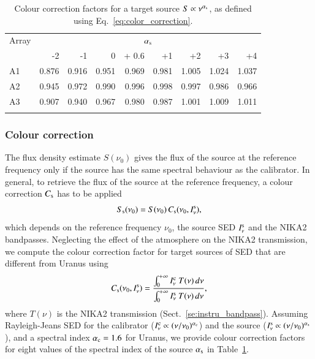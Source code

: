 \documentclass[traditionalabstract]{aa}
\begin{document}
\begin{table}[!thbp]
\caption{Colour correction factors for a target source  $S \propto \nu^{\alpha_{\rm{s}}}$, as defined using Eq.~\ref{eq:color_correction}.}
\label{tab:mod}
\centering 
\begin{tabular}{lrrrrrrrr}
\hline\hline
\noalign{\smallskip}
Array     & \multicolumn{8}{c}{$\alpha_{\rm{s}}$} \\
\noalign{\smallskip}
\hline
\noalign{\smallskip}
         &  -2 &  -1    &    0  & + 0.6 & +1  &  +2  & +3 & +4  \\       
\noalign{\smallskip}
\hline
\noalign{\smallskip}
          A1   & 0.876  &  0.916   &   0.951  & 0.969 &  0.981   &  1.005  &    1.024  &  1.037   \\
          A2   & 0.945  &  0.972   &   0.990  & 0.996 &  0.998   &  0.997  &    0.986  &  0.966      \\ 
          A3   & 0.907  &  0.940   &   0.967  & 0.980 &  0.987   &  1.001  &    1.009  &  1.011     \\
            \noalign{\smallskip}
            \hline
\end{tabular}
\end{table}

\subsubsection{Colour correction}

The flux density estimate $S(\nu_{0})$ gives the
flux of the source at the reference frequency only if the source has
the same spectral behaviour as the calibrator. In general, to retrieve the
flux of the source at the reference frequency, a colour correction
$C_{\rm{s}}$ has to be applied
\begin{equation}
S_{\rm{s}}(\nu_{0}) = S(\nu_{0}) \,  C_{\rm{s}}(\nu_{0}, I_\nu^{\rm{s}}),
\end{equation}
which depends on the reference frequency $\nu_{0}$, the source
SED $I_\nu^{\rm{s}}$ and the NIKA2 bandpasses.
Neglecting the effect of the atmosphere on the NIKA2 transmission, we
compute the colour correction factor for target sources of SED that are
different from Uranus using
\begin{equation}
  C_{\rm{s}}(\nu_{0}, I_\nu^{\rm{s}}) = \frac{\int_{0}^{+\infty} I_\nu^{\rm{c}}~T({\nu})\, d\nu}{ \int_{0}^{+\infty} I_\nu^{\rm{s}}~ T({\nu})\, d\nu},
    \label{eq:color_correction}
\end{equation}
where $T({\nu})$ is the NIKA2 transmission
(Sect.~\ref{se:instru_bandpass}).
Assuming Rayleigh-Jeans SED for the calibrator
($I_\nu^{\rm{c}} \propto (\nu/\nu_0)^{\alpha_{\rm{c}}}$) and the source
($I_\nu^{\rm{s}} \propto (\nu/\nu_0)^{\alpha_{\rm{s}}}$), and a
spectral index $\alpha_{\rm{c}} = 1.6$ for Uranus, we provide colour
correction factors for eight values of the spectral index of the
source $\alpha_{\rm{s}}$ in Table~\ref{tab:mod}.
\end{document}
